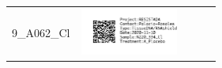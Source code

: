 \documentclass[10pt,notitlepage,letterpaper]{article}
\def\s{\phantom{xx}}
\def\w{1.27in}
\def\h{-0.030in}
\begin{document}
\begin{tabular}[t]{ c @{\s} c @{\s} c @{\s} c @{\s} c }
9_A062_Cl} &  \includegraphics[width=\w]{label_N220_334_Cl} \\[\h] 
\end{tabular}
\end{document}
